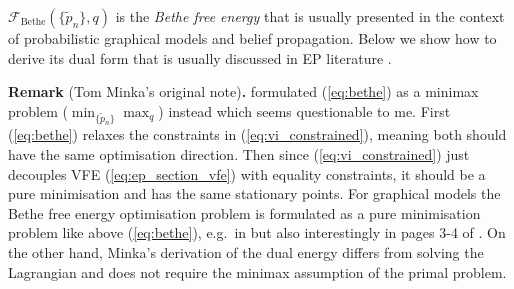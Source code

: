 $\mathcal{F}_{\text{Bethe}}( \{ \tilde{p}_n \}, q)$ is the \emph{Bethe free energy} \citep{bethe:energy1935, yedidia:bethe2001} that is usually presented in the context of probabilistic graphical models and belief propagation. Below we show how to derive its dual form that is usually discussed in EP literature \citep{minka:ep_energy2001, opper:ec2005, seeger:ep2005}. 

\vspace{1em}
\begin{tcolorbox}
\textbf{Remark} (Tom Minka's original note)\textbf{.}
\cite{minka:ep_energy2001} formulated (\ref{eq:bethe}) as a minimax problem ($\min_{\{\tilde{p}_n \}} \max_{q}$) instead which seems questionable to me.  First (\ref{eq:bethe}) relaxes the constraints in (\ref{eq:vi_constrained}), meaning both should have the same optimisation direction. Then since (\ref{eq:vi_constrained}) just decouples VFE (\ref{eq:ep_section_vfe}) with equality constraints, it should be a pure minimisation and has the same stationary points. For graphical models the Bethe free energy optimisation problem is formulated as a pure minimisation problem like above (\ref{eq:bethe}), e.g.~in \cite{heskes:bp_fixed_point2002, wainwright:graphical2008} but also interestingly in pages 3-4 of \cite{minka:ep_energy2001}. On the other hand, Minka's derivation of the dual energy differs from solving the Lagrangian and does not require the minimax assumption of the primal problem. 
\end{tcolorbox}

